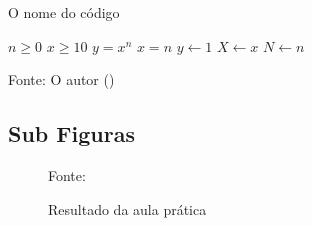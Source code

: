 \begin{algorithm} [H]
	\caption{O nome do código}\label{alg:cap}

	\begin{algorithmic} [H]
		\Require $n \geq 0$	
    \Require $x \geq 10$	
		\Ensure $y = x^n$   	
    \Ensure $x = n $      
		\State $y \gets 1$
		\State $X \gets x$
		\State $N \gets n$
	\end{algorithmic}

  \raggedright{\fontsize{10pt}{\baselineskip}\selectfont Fonte: O autor (\ano)}
\end{algorithm}

\subsection{Sub Figuras}

\begin{figure}[H] %
  \center
  \caption{Resultado da aula prática}
  \label{fig:ap1_cod_vigual1}

  \raggedright{\fontsize{10pt}{\baselineskip}\selectfont Fonte: }

\end{figure}

